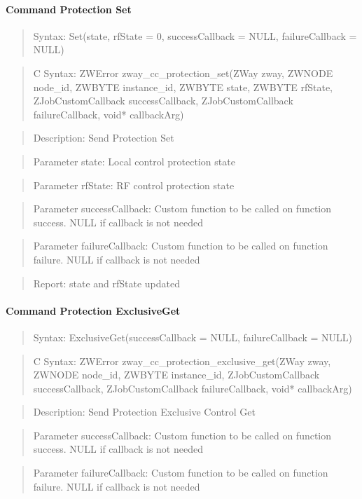 \paragraph{Command Protection Set}
\begin{quote}Syntax: Set(state, rfState = 0, successCallback = NULL, failureCallback = NULL)\end{quote}
\begin{quote}C Syntax: ZWError zway\_cc\_protection\_set(ZWay zway, ZWNODE node\_id, ZWBYTE instance\_id, ZWBYTE state, ZWBYTE rfState, ZJobCustomCallback successCallback, ZJobCustomCallback failureCallback, void* callbackArg)\end{quote}
\begin{quote}Description: Send Protection Set\end{quote}
\begin{quote}Parameter state: Local control protection state\end{quote}
\begin{quote}Parameter rfState: RF control protection state\end{quote}
\begin{quote}Parameter successCallback: Custom function to be called on function success. NULL if callback is not needed\end{quote}
\begin{quote}Parameter failureCallback: Custom function to be called on function failure. NULL if callback is not needed\end{quote}
\begin{quote}Report: state and rfState updated\end{quote}

\paragraph{Command Protection ExclusiveGet}
\begin{quote}Syntax: ExclusiveGet(successCallback = NULL, failureCallback = NULL)\end{quote}
\begin{quote}C Syntax: ZWError zway\_cc\_protection\_exclusive\_get(ZWay zway, ZWNODE node\_id, ZWBYTE instance\_id, ZJobCustomCallback successCallback, ZJobCustomCallback failureCallback, void* callbackArg)\end{quote}
\begin{quote}Description: Send Protection Exclusive Control Get\end{quote}
\begin{quote}Parameter successCallback: Custom function to be called on function success. NULL if callback is not needed\end{quote}
\begin{quote}Parameter failureCallback: Custom function to be called on function failure. NULL if callback is not needed\end{quote}


